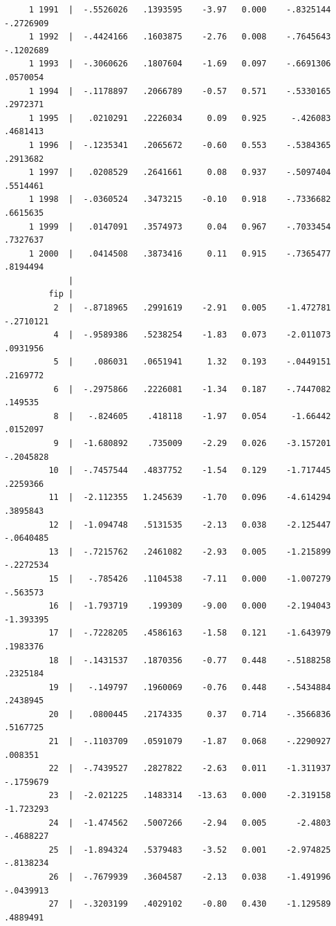 \documentclass[
]{book}
\begin{document}
\begin{verbatim}
     1 1991  |  -.5526026   .1393595    -3.97   0.000    -.8325144   -.2726909
     1 1992  |  -.4424166   .1603875    -2.76   0.008    -.7645643   -.1202689
     1 1993  |  -.3060626   .1807604    -1.69   0.097    -.6691306    .0570054
     1 1994  |  -.1178897   .2066789    -0.57   0.571    -.5330165    .2972371
     1 1995  |   .0210291   .2226034     0.09   0.925     -.426083    .4681413
     1 1996  |  -.1235341   .2065672    -0.60   0.553    -.5384365    .2913682
     1 1997  |   .0208529   .2641661     0.08   0.937    -.5097404    .5514461
     1 1998  |  -.0360524   .3473215    -0.10   0.918    -.7336682    .6615635
     1 1999  |   .0147091   .3574973     0.04   0.967    -.7033454    .7327637
     1 2000  |   .0414508   .3873416     0.11   0.915    -.7365477    .8194494
             |
         fip |
          2  |  -.8718965   .2991619    -2.91   0.005    -1.472781   -.2710121
          4  |  -.9589386   .5238254    -1.83   0.073    -2.011073    .0931956
          5  |    .086031   .0651941     1.32   0.193    -.0449151    .2169772
          6  |  -.2975866   .2226081    -1.34   0.187    -.7447082     .149535
          8  |   -.824605    .418118    -1.97   0.054     -1.66442    .0152097
          9  |  -1.680892    .735009    -2.29   0.026    -3.157201   -.2045828
         10  |  -.7457544   .4837752    -1.54   0.129    -1.717445    .2259366
         11  |  -2.112355   1.245639    -1.70   0.096    -4.614294    .3895843
         12  |  -1.094748   .5131535    -2.13   0.038    -2.125447   -.0640485
         13  |  -.7215762   .2461082    -2.93   0.005    -1.215899   -.2272534
         15  |   -.785426   .1104538    -7.11   0.000    -1.007279    -.563573
         16  |  -1.793719    .199309    -9.00   0.000    -2.194043   -1.393395
         17  |  -.7228205   .4586163    -1.58   0.121    -1.643979    .1983376
         18  |  -.1431537   .1870356    -0.77   0.448    -.5188258    .2325184
         19  |   -.149797   .1960069    -0.76   0.448    -.5434884    .2438945
         20  |   .0800445   .2174335     0.37   0.714    -.3566836    .5167725
         21  |  -.1103709   .0591079    -1.87   0.068    -.2290927     .008351
         22  |  -.7439527   .2827822    -2.63   0.011    -1.311937   -.1759679
         23  |  -2.021225   .1483314   -13.63   0.000    -2.319158   -1.723293
         24  |  -1.474562   .5007266    -2.94   0.005      -2.4803   -.4688227
         25  |  -1.894324   .5379483    -3.52   0.001    -2.974825   -.8138234
         26  |  -.7679939   .3604587    -2.13   0.038    -1.491996   -.0439913
         27  |  -.3203199   .4029102    -0.80   0.430    -1.129589    .4889491

\end{verbatim}
\end{document}
